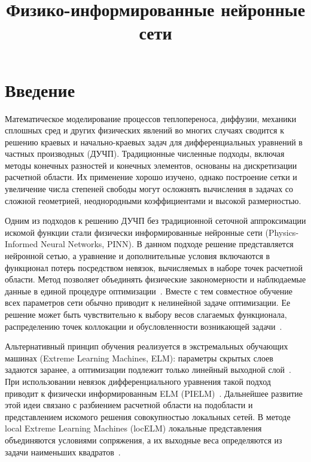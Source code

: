 \documentclass{misisarticle}
\title{Физико-информированные нейронные сети}
\begin{document}
\maketitle

\section{Введение}

Математическое моделирование процессов теплопереноса, диффузии, механики сплошных сред и других физических явлений во многих случаях сводится к решению краевых и начально-краевых задач для дифференциальных уравнений в частных производных (ДУЧП). Традиционные численные подходы, включая методы конечных разностей и конечных элементов, основаны на дискретизации расчетной области. Их применение хорошо изучено, однако построение сетки и увеличение числа степеней свободы могут осложнять вычисления в задачах со сложной геометрией, неоднородными коэффициентами и высокой размерностью.

Одним из подходов к решению ДУЧП без традиционной сеточной аппроксимации искомой функции стали физически информированные нейронные сети (Physics-Informed Neural Networks, PINN). В данном подходе решение представляется нейронной сетью, а уравнение и дополнительные условия включаются в функционал потерь посредством невязок, вычисляемых в наборе точек расчетной области. Метод позволяет объединять физические закономерности и наблюдаемые данные в единой процедуре оптимизации~\cite{raissi2019}. Вместе с тем совместное обучение всех параметров сети обычно приводит к нелинейной задаче оптимизации. Ее решение может быть чувствительно к выбору весов слагаемых функционала, распределению точек коллокации и обусловленности возникающей задачи~\cite{rathore2024}.

Альтернативный принцип обучения реализуется в экстремальных обучающих машинах (Extreme Learning Machines, ELM): параметры скрытых слоев задаются заранее, а оптимизации подлежит только линейный выходной слой~\cite{huang2006}. При использовании невязок дифференциального уравнения такой подход приводит к физически информированным ELM (PIELM)~\cite{dwivedi2020}. Дальнейшее развитие этой идеи связано с разбиением расчетной области на подобласти и представлением искомого решения совокупностью локальных сетей. В методе local Extreme Learning Machines (locELM) локальные представления объединяются условиями сопряжения, а их выходные веса определяются из задачи наименьших квадратов~\cite{dongli2021}.
\end{document}
